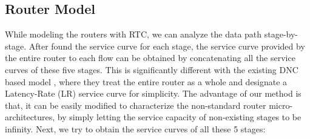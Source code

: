 \documentclass[10pt,journal]{IEEEtran}
\begin{document}
\subsection{Router Model}\label{router}
While modeling the routers with RTC, we can analyze the data path stage-by-stage. After found the service curve for each stage, the service curve provided by the entire router to each flow can be obtained by concatenating all the service curves of these five stages. This is significantly different with the existing DNC based model \cite{qian2009analysis,Qian489900}, where they treat the entire router as a whole and designate a Latency-Rate (LR) service curve for simplicity. The advantage of our method is that, it can be easily modified to characterize the non-standard router micro-architectures, by simply letting the service capacity of non-existing stages to be infinity. Next, we try to obtain the service curves of all these 5 stages:
\end{document}

